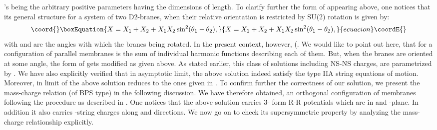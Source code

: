 \documentclass[a4paper,12pt,fleqn,cite,epsfig]{article}
\begin{document}
\coordHE{}'s being the arbitrary
positive parameters having the dimensions of length. 
To clarify further the form of \coordHE{} appearing above, one notices that
its general structure for a system of two D2-branes, 
when their relative orientation is restricted by SU(2) rotation
is given by\cite{myers1,hambli,vijay}:
\begin{equation}\coord{}\boxEquation{
X = X_1 + X_2 + X_1 X_2 \sin^2(\theta_1 - \theta_2),
}{
X = X_1 + X_2 + X_1 X_2 \sin^2(\theta_1 - \theta_2),
}{ecuacion}\coordE{}\end{equation}
with \coordHE{} and \coordHE{} are the angles with which the branes
being rotated. In the present context, however, 
(\coordHE{}. 
We would like to point out here, that for a configuration of
parallel membranes \coordHE{} is the sum of individual 
harmonic functions describing each of them. But, 
when the branes are oriented at some angle, the form of \coordHE{} gets
modified as given above. As stated earlier, this class
of solutions including NS-NS charges, are parametrized by \myHighlight{$\alpha$}\coordHE{}. 
We have also explicitly verified that in asymptotic limit, 
the above solution indeed
satisfy the type IIA string equations of motion. Moreover, in
\coordHE{} limit of the above solution reduces 
to the ones given in \cite{tseyt,hambli}. To confirm further the 
correctness of our solution, we present the mass-charge relation 
(of BPS type) in the following discussion. We have therefore obtained,
an orthogonal configuration of membranes following the procedure as
described in \cite{myers}. One notices that the above solution carries 
3- form R-R potentials which are in \coordHE{} and
\coordHE{}-plane. In addition it
also carries \coordHE{}-string charges along \coordHE{} and \coordHE{} directions.  
We now go on to check its supersymmetric
property by analyzing the mass-charge relationship explicitly.  
\end{document}
